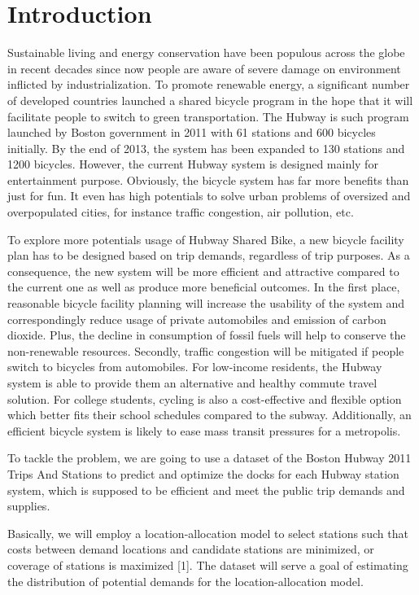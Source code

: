 \documentclass[journal, letterpaper]{IEEEtran}
\begin{document}
\section{Introduction}
\large
Sustainable living and energy conservation have been populous across the globe in recent decades since now people are aware of severe damage on environment inflicted by industrialization. To promote renewable energy, a significant number of developed countries launched a shared bicycle program in the hope that it will facilitate people to switch to green transportation. The Hubway is such program launched by Boston government in 2011 with 61 stations and 600 bicycles initially. By the end of 2013, the system has been expanded to 130 stations and 1200 bicycles. However, the current Hubway system is designed mainly for entertainment purpose. Obviously, the bicycle system has far more benefits than just for fun. It even has high potentials to solve urban problems of oversized and overpopulated cities, for instance traffic congestion, air pollution, etc. 

To explore more potentials usage of Hubway Shared Bike, a new bicycle facility plan has to be designed based on trip demands, regardless of trip purposes. As a consequence, the new system will be more efficient and attractive compared to the current one as well as produce more beneficial outcomes. In the first place, reasonable bicycle facility planning will increase the usability of the system and correspondingly reduce usage of private automobiles and emission of carbon dioxide. Plus, the decline in consumption of fossil fuels will help to conserve the non-renewable resources. Secondly, traffic congestion will be mitigated if people switch to bicycles from automobiles. For low-income residents, the Hubway system is able to provide them an alternative and healthy commute travel solution. For college students, cycling is also a cost-effective and flexible option which better fits their school schedules compared to the subway. Additionally, an efficient bicycle system is likely to ease mass transit pressures for a metropolis.   

To tackle the problem, we are going to use a dataset of the Boston Hubway 2011 Trips And Stations to predict and optimize the docks for each Hubway station system, which is supposed to be efficient and meet the public trip demands and supplies.

Basically, we will employ a location-allocation model to select stations such that costs between demand locations and candidate stations are minimized, or coverage of stations is maximized [1]. The dataset will serve a goal of estimating the distribution of potential demands for the location-allocation model.
\end{document}

